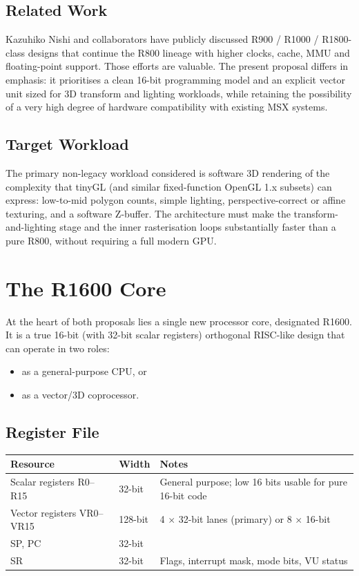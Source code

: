 \documentclass[11pt,a4paper]{article}
\begin{document}
\subsection{Related Work}

Kazuhiko Nishi and collaborators have publicly discussed R900 / R1000 / R1800-class designs that continue the R800 lineage with higher clocks, cache, MMU and floating-point support. Those efforts are valuable. The present proposal differs in emphasis: it prioritises a clean 16-bit programming model and an explicit vector unit sized for 3D transform and lighting workloads, while retaining the possibility of a very high degree of hardware compatibility with existing MSX systems.

\subsection{Target Workload}

The primary non-legacy workload considered is software 3D rendering of the complexity that tinyGL (and similar fixed-function OpenGL 1.x subsets) can express: low-to-mid polygon counts, simple lighting, perspective-correct or affine texturing, and a software Z-buffer. The architecture must make the transform-and-lighting stage and the inner rasterisation loops substantially faster than a pure R800, without requiring a full modern GPU.

\section{The R1600 Core}

At the heart of both proposals lies a single new processor core, designated R1600. It is a true 16-bit (with 32-bit scalar registers) orthogonal RISC-like design that can operate in two roles:

\begin{itemize}
    \item as a general-purpose CPU, or
    \item as a vector/3D coprocessor.
\end{itemize}

\subsection{Register File}

\begin{center}
\begin{tabular}{@{}llp{6cm}@{}}
\toprule
Resource & Width & Notes \\
\midrule
Scalar registers R0--R15 & 32-bit & General purpose; low 16 bits usable for pure 16-bit code \\
Vector registers VR0--VR15 & 128-bit & 4 $\times$ 32-bit lanes (primary) or 8 $\times$ 16-bit \\
SP, PC & 32-bit & \\
SR & 32-bit & Flags, interrupt mask, mode bits, VU status \\
\bottomrule
\end{tabular}
\end{center}
\end{document}
